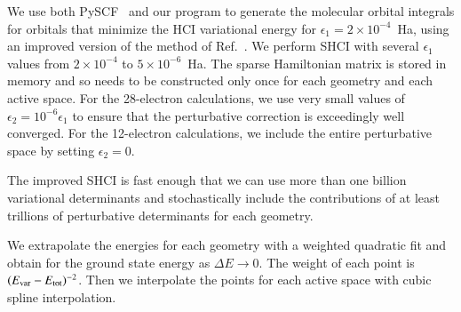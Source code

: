 We use both PySCF~\cite{SunCha_etal_PySCF-ComMolSci-18} and our program to generate the molecular orbital integrals for orbitals that minimize the HCI variational
energy for $\epsilon_1=2\times 10^{-4}$~Ha, using an improved version of the method of Ref.~\cite{SmiMusHolSha-JCTC-17}.
We perform SHCI with several $\epsilon_1$ values from $2\times10^{-4}$ to $5\times10^{-6}$~Ha.
The sparse Hamiltonian matrix is stored in memory and so needs to be constructed only once for each geometry and each active space.
For the 28-electron calculations, we use very small values of $\epsilon_2 = 10^{-6} \epsilon_1$  to ensure that the perturbative correction is exceedingly well converged.
For the 12-electron calculations, we include the entire perturbative space by setting $\epsilon_2=0$.

The improved SHCI is fast enough that we can use more than one billion variational determinants and stochastically include the contributions of at least trillions of perturbative determinants for each geometry.

We extrapolate the energies for each geometry with a weighted quadratic fit
and obtain for the ground state energy as $\Delta E\to0$.
The weight of each point is $(E_{\rm var} - E_{\rm tot})^{-2}$.
Then we interpolate the points for each active space with cubic spline interpolation.

